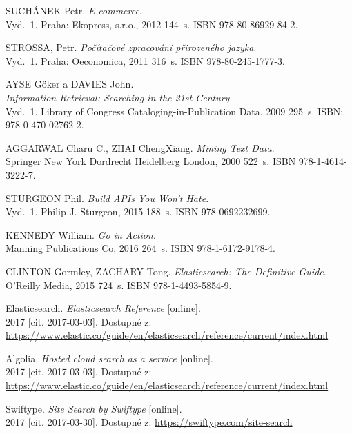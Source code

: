\documentclass[FM,DP]{tulthesis}
\begin{document}
\begin{thebibliography}{Mm99}

 SUCHÁNEK Petr. \emph{E-commerce}. \\
Vyd.~1. Praha: Ekopress, s.r.o., 2012 144~s. ISBN 978-80-86929-84-2.

 STROSSA, Petr. \emph{Počítačové zpracování přirozeného jazyka}. \\
Vyd.~1. Praha: Oeconomica, 2011 316~s. ISBN 978-80-245-1777-3.

 AYSE Göker a DAVIES John. \\
\emph{Information Retrieval: Searching in the 21st Century}. \\
Vyd.~1. Library of Congress Cataloging-in-Publication Data, 2009 295~s. ISBN: 978-0-470-02762-2.

 AGGARWAL Charu C., ZHAI ChengXiang. \emph{Mining Text Data}. \\
Springer New York Dordrecht Heidelberg London, 2000 522~s. ISBN 978-1-4614-3222-7.

 STURGEON Phil. \emph{Build APIs You Won't Hate}. \\
Vyd.~1. Philip J. Sturgeon, 2015 188~s. ISBN 978-0692232699.

 KENNEDY William. \emph{Go in Action}. \\
Manning Publications Co, 2016 264~s. ISBN 978-1-6172-9178-4.

 CLINTON Gormley, ZACHARY Tong. \emph{Elasticsearch: The Definitive Guide}. \\
O'Reilly Media, 2015 724~s. ISBN 978-1-4493-5854-9.

 Elasticsearch. \emph{Elasticsearch Reference} [online]. \\
2017 [cit. 2017-03-03]. Dostupné z:\\
\url{https://www.elastic.co/guide/en/elasticsearch/reference/current/index.html}

 Algolia. \emph{Hosted cloud search as a service} [online]. \\
2017 [cit. 2017-03-03]. Dostupné z:\\
\url{https://www.elastic.co/guide/en/elasticsearch/reference/current/index.html}

 Swiftype. \emph{Site Search by Swiftype} [online]. \\
2017 [cit. 2017-03-30]. Dostupné z: \url{https://swiftype.com/site-search}


\end{thebibliography}
\end{document}
